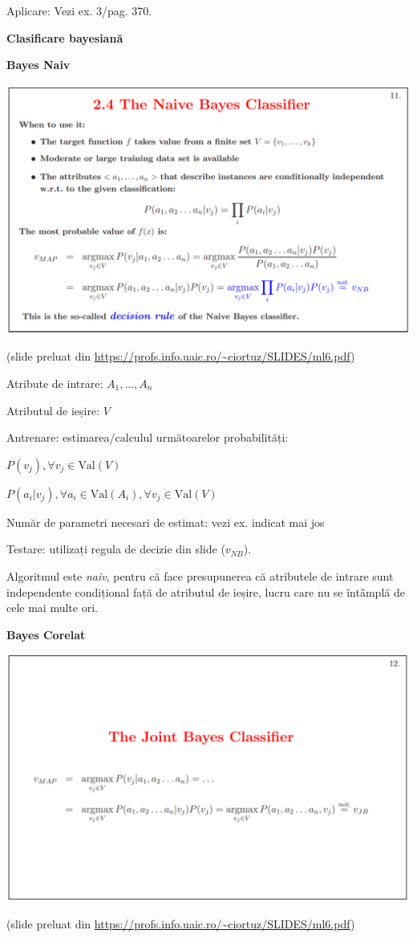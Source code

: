 \documentclass[12pt]{article}
\begin{document}
	Aplicare: Vezi ex. 3/pag. 370.
	
	\newpage
	
	\textbf{\large{Clasificare bayesiană}}
	
	\textbf{\large{Bayes Naiv}}
	\begin{center}
		\includegraphics[width=1\linewidth]{screenshot002}
	\end{center}
	(slide preluat din \url{https://profs.info.uaic.ro/~ciortuz/SLIDES/ml6.pdf})
	
	Atribute de intrare: $A_1, \dots, A_n$
	
	Atributul de ieșire: $V$
	
	Antrenare: estimarea/calculul următoarelor probabilități:
	
	$P(v_j), \forall v_j \in \text{Val}(V)$
	
	$P(a_i | v_j), \forall a_i \in \text{Val}(A_i), \forall v_j \in \text{Val}(V)$
	
	Număr de parametri necesari de estimat: vezi ex. indicat mai jos
	
	Testare: utilizați regula de decizie din slide ($v_{NB}$).
	
	Algoritmul este \textit{naiv}, pentru că face presupunerea că atributele de intrare sunt independente condițional față de atributul de ieșire, lucru care nu se întâmplă de cele mai multe ori.
	
	\newpage
	
	\textbf{\large{Bayes Corelat}}
	\begin{center}
		\includegraphics[width=1\linewidth]{screenshot003}
	\end{center}
	(slide preluat din \url{https://profs.info.uaic.ro/~ciortuz/SLIDES/ml6.pdf})
	
\end{document}

